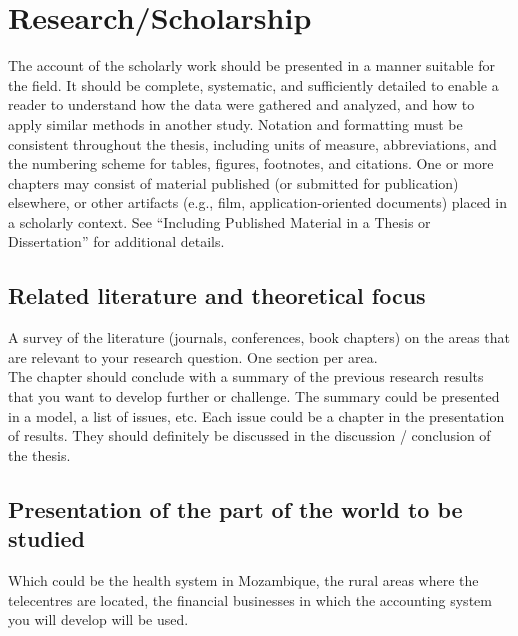\chapter{Research/Scholarship}
  The account of the scholarly work should be presented in a 
    manner suitable for the field. It should be complete, systematic, and sufficiently detailed to 
    enable a reader to understand how the data were gathered and analyzed, and how to apply similar 
    methods in another study. Notation and formatting must be consistent throughout the thesis, 
    including units of measure, abbreviations, and the numbering scheme for tables, figures, 
    footnotes, and citations. One or more chapters may consist of material published (or submitted
    for publication) elsewhere, or other artifacts (e.g., film, application-oriented documents) 
    placed in a scholarly context. See “Including Published Material in a Thesis or Dissertation” 
    for additional details. \\

  \section{Related literature and theoretical focus}
    A survey of the literature (journals, conferences, book chapters) on the areas that are relevant 
      to your research question. One section per area. \\
    The chapter should conclude with a summary of the previous research results that you want to 
      develop further or challenge. The summary could be presented in a model, a list of issues, etc. 
      Each issue could be a chapter in the presentation of results. They should definitely be 
      discussed in the discussion / conclusion of the thesis. 

  \section{Presentation of the part of the world to be studied}
    Which could be the health system in Mozambique, the rural areas where the telecentres are located, 
      the financial businesses in which the accounting system you will develop will be used. 

